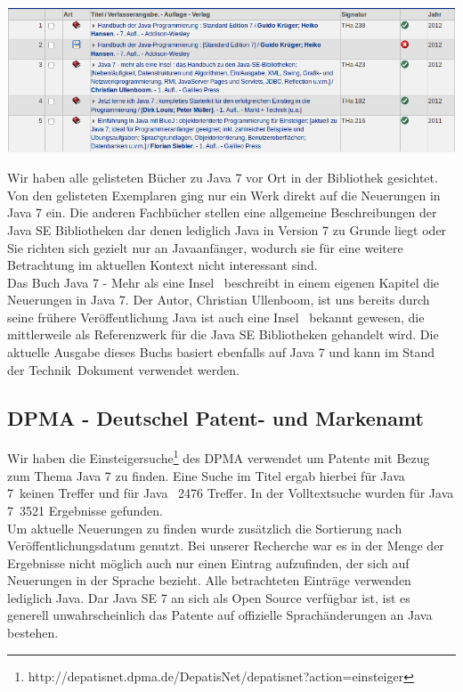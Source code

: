 \begin{center}
\includegraphics[width=\textwidth]{images/dhbw-lib-search-results.png}
\end{center}

Wir haben alle gelisteten Bücher zu Java 7 vor Ort in der Bibliothek gesichtet. Von den gelisteten Exemplaren ging nur ein Werk\cite{javainsel2} direkt auf die Neuerungen in Java 7 ein. Die anderen Fachbücher stellen eine allgemeine Beschreibungen der Java SE Bibliotheken dar denen lediglich Java in Version 7 zu Grunde liegt\cite{dhLibHandbuchJava} oder Sie richten sich gezielt nur an Javaanfänger\cite{dhLibJetztJavaLernen}\cite{dhLibBlueJStart}, wodurch sie für eine weitere Betrachtung im aktuellen Kontext nicht interessant sind.\\

Das Buch \glqq Java 7 - Mehr als eine Insel\grqq\cite{javainsel2} ~beschreibt in einem eigenen Kapitel die Neuerungen in Java 7. Der Autor, Christian Ullenboom, ist uns bereits durch seine frühere Veröffentlichung \glqq Java ist auch eine Insel\grqq\cite{javainsel1} ~bekannt gewesen, die mittlerweile als Referenzwerk für die Java SE Bibliotheken gehandelt wird. Die aktuelle Ausgabe dieses Buchs basiert ebenfalls auf Java 7 und kann im \glqq Stand der Technik\grqq ~Dokument verwendet werden.

\subsection{DPMA - Deutschel Patent- und Markenamt}
Wir haben die Einsteigersuche\footnote{http://depatisnet.dpma.de/DepatisNet/depatisnet?action=einsteiger} des DPMA verwendet um Patente mit Bezug zum Thema Java 7 zu finden. Eine Suche im Titel ergab hierbei für \glqq Java 7\grqq ~keinen Treffer und für \glqq Java \grqq ~2476 Treffer. In der Volltextsuche wurden für \glqq Java 7\grqq ~3521 Ergebnisse gefunden.\\

Um aktuelle Neuerungen zu finden wurde zusätzlich die Sortierung nach Veröffentlichungsdatum genutzt. Bei unserer Recherche war es in der Menge der Ergebnisse nicht möglich auch nur einen Eintrag aufzufinden, der sich auf Neuerungen in der Sprache bezieht. Alle betrachteten Einträge verwenden lediglich Java. Dar Java SE 7 an sich als Open Source verfügbar ist, ist es generell unwahrscheinlich das Patente auf offizielle Sprachänderungen an Java bestehen.\\

%


